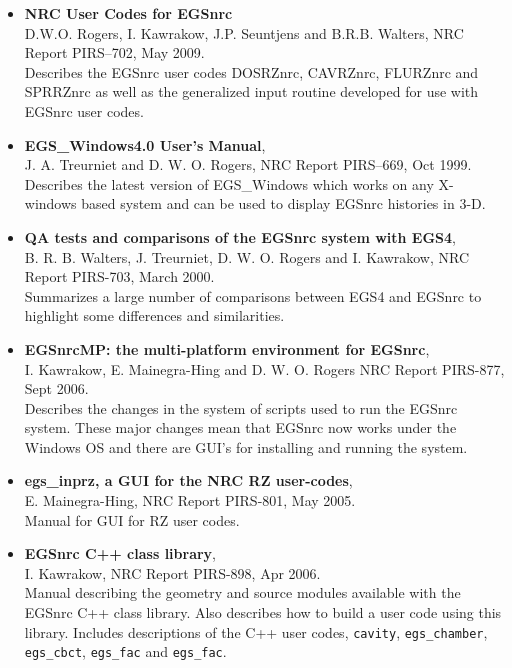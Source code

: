 \begin{itemize}
\item {\bfseries NRC User Codes for EGSnrc}\\ D.W.O. Rogers, I. Kawrakow, J.P.
Seuntjens and B.R.B. Walters, NRC Report PIRS--702, May 2009.\\
Describes the EGSnrc user codes DOSRZnrc, CAVRZnrc, FLURZnrc and
SPRRZnrc as well as the generalized input routine developed for use with
EGSnrc user codes.

\item {\bfseries EGS\_Windows4.0 User's Manual},\\ J. A.  Treurniet and D.
W. O.  Rogers, NRC Report PIRS--669, Oct 1999.\\
Describes the latest version of  EGS\_Windows which works on any X-windows
based system and can be used to display EGSnrc histories in 3-D.\\


\item {\bfseries  QA tests and comparisons of the EGSnrc system
with EGS4},\\ B. R. B. Walters, J. Treurniet, D. W. O. Rogers
               and I. Kawrakow, NRC Report PIRS-703, March 2000.\\
Summarizes a large number of comparisons between EGS4 and EGSnrc to
highlight some differences and similarities.\\


\item {\bfseries  EGSnrcMP: the multi-platform environment for EGSnrc}, \\
I. Kawrakow, E. Mainegra-Hing and D. W. O. Rogers
           NRC Report PIRS-877, Sept 2006.\\
Describes the changes in the system of scripts used to run the EGSnrc
system. These major changes mean that EGSnrc now works under the Windows OS
and there are GUI's for installing and running the system.\\


\item {\bfseries egs\_inprz, a GUI for the NRC RZ user-codes}, \\
E. Mainegra-Hing, NRC Report PIRS-801, May 2005.\\
Manual for GUI for RZ user codes.\\


\item {\bfseries EGSnrc C++ class library},\\
I. Kawrakow, NRC Report PIRS-898, Apr 2006.\\
Manual describing the geometry and source modules available with the
EGSnrc C++ class library.  Also describes how to build a user code using
this library.  Includes descriptions of the C++ user codes, {\tt cavity},
{\tt egs\_chamber}, {\tt egs\_cbct}, {\tt egs\_fac} and {\tt egs\_fac}.\\

\end{itemize}



